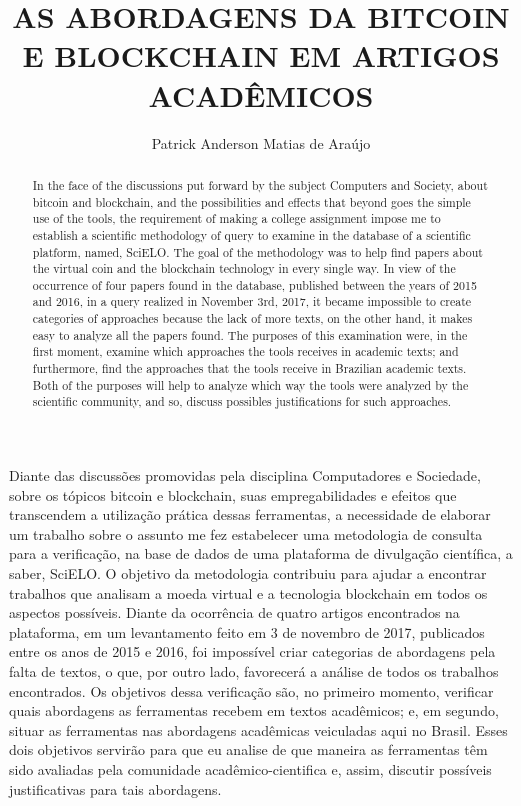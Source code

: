 \documentclass[12pt]{article}
\title{AS ABORDAGENS DA BITCOIN E BLOCKCHAIN EM ARTIGOS ACADÊMICOS}
\author{Patrick Anderson Matias de Araújo\inst{1}}
\begin{document}
 

\maketitle
     
\begin{resumo} 
  Diante das discussões promovidas pela disciplina Computadores e Sociedade, sobre os tópicos bitcoin e blockchain, suas empregabilidades e efeitos que transcendem a utilização prática dessas ferramentas, a necessidade de elaborar um trabalho sobre o assunto me fez estabelecer uma metodologia de consulta para a verificação, na base de dados de uma plataforma de divulgação científica, a saber, SciELO. O objetivo da metodologia contribuiu para ajudar a encontrar trabalhos que analisam a moeda virtual e a tecnologia blockchain em todos os aspectos possíveis. Diante da ocorrência de quatro artigos encontrados na plataforma, em um levantamento feito em 3 de novembro de 2017, publicados entre os anos de 2015 e 2016, foi impossível criar categorias de abordagens pela falta de textos, o que, por outro lado, favorecerá a análise de todos os trabalhos encontrados. Os objetivos dessa verificação são, no primeiro momento, verificar quais abordagens as ferramentas recebem em textos acadêmicos; e, em segundo, situar as ferramentas nas abordagens acadêmicas veiculadas aqui no Brasil. Esses dois objetivos servirão para que eu analise de que maneira as ferramentas têm sido avaliadas pela comunidade acadêmico-cientifica e, assim, discutir possíveis justificativas para tais abordagens.
\end{resumo}

\begin{abstract}
In the face of the discussions put forward by the subject Computers and Society, about bitcoin and blockchain, and the possibilities and effects that beyond goes  the simple use of the tools, the requirement of making a college assignment impose me to establish a scientific methodology of query to examine in the database of a scientific platform, named, SciELO. The goal of the methodology was to help find papers about the virtual coin and the blockchain technology in every single way. In view of the occurrence of four papers found in the database, published between the years of 2015 and 2016, in a query realized in November 3rd, 2017, it became impossible to create categories of approaches because the lack of more texts, on the other hand, it makes easy to analyze all the papers found. The purposes of this examination were, in the first moment, examine which approaches the tools receives in academic texts; and furthermore, find the approaches that the tools receive in Brazilian academic texts. Both of the purposes will help to analyze which way the tools were analyzed by the scientific community, and so, discuss possibles justifications for such approaches.
\end{abstract}
\end{document}
